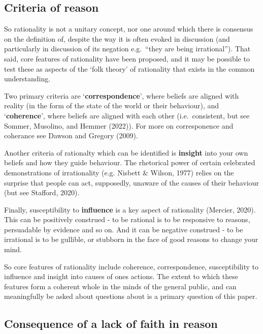 \documentclass[
  ,jou,floatsintext]{apa6}
\begin{document}
\hypertarget{criteria-of-reason}{%
\subsection{Criteria of reason}\label{criteria-of-reason}}

So rationality is not a unitary concept, nor one around which there is consensus on the definition of, despite the way it is often evoked in discussion (and particularly in discussion of its negation e.g.~``they are being irrational''). That said, core features of rationality have been proposed, and it may be possible to test these as aspects of the `folk theory' of rationality that exists in the common understanding.

Two primary criteria are `\textbf{correspondence}', where beliefs are aligned with reality (in the form of the state of the world or their behaviour), and `\textbf{coherence}', where beliefs are aligned with each other (i.e.~consistent, but see Sommer, Musolino, and Hemmer (2022)). For more on corresponence and coherance see Dawson and Gregory (2009).

Another criteria of rationalty which can be identified is \textbf{insight} into your own beliefs and how they guide behaviour. The rhetorical power of certain celebrated demonstrations of irrationality (e.g. Nisbett \& Wilson, 1977) relies on the surprise that people can act, supposedly, unaware of the causes of their behaviour (but see Stafford, 2020).

Finally, susceptibility to \textbf{influence} is a key aspect of rationality (Mercier, 2020). This can be positively construed - to be rational is to be responsive to reasons, persuadable by evidence and so on. And it can be negative construed - to be irrational is to be gullible, or stubborn in the face of good reasons to change your mind.

So core features of rationality include coherence, correspondence, susceptibility to influence and insight into causes of ones actions. The extent to which these features form a coherent whole in the minds of the general public, and can meaningfully be asked about questions about is a primary question of this paper.

\hypertarget{consequence-of-a-lack-of-faith-in-reason}{%
\subsection{Consequence of a lack of faith in reason}\label{consequence-of-a-lack-of-faith-in-reason}}
\end{document}
